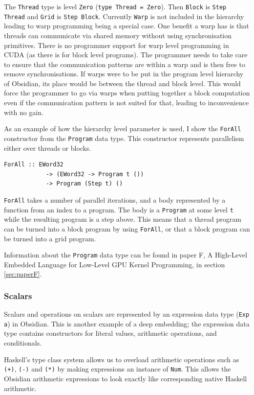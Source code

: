 \documentclass[a4paper]{book}
\newcommand{\paperFTitle}{A High-Level Embedded Language for Low-Level GPU Kernel Programming}
\begin{document}
The {\tt Thread} type is level {\tt Zero} ({\tt type Thread = Zero}). Then {\tt Block} is 
{\tt Step Thread} and {\tt Grid} is {\tt Step Block}. Currently {\tt Warp} is not included 
in the hierarchy leading to warp programming being a special case. One benefit a warp has is 
that threads can communicate via shared memory without using synchronisation primitives. There 
is no programmer support for warp level programming in CUDA (as there is for block level 
programs). The programmer needs to take care to ensure that the communication patterns are 
within a warp and is then free to remove synchronisations. If warps were to be put in the 
program level hierarchy of Obsidian, its place would be between the thread and block level. 
This would force the programmer to go via warps when putting together a block computation even 
if the communication pattern is not suited for that, leading to inconvenience with no gain. 

As an example of how the hierarchy level parameter is used, I show the {\tt ForAll} constructor 
from the {\tt Program} data type.  This constructor represents parallelism either over threads 
or blocks. 

\begin{verbatim}
ForAll :: EWord32 
            -> (EWord32 -> Program t ())
            -> Program (Step t) ()
\end{verbatim}

{\tt ForAll} takes a number of parallel iterations, and a body represented by a function 
from an index to a program. The body is a {\tt Program} at some level {\tt t} while the 
resulting program is a step above. This means that a thread program can be turned into 
a block program by using {\tt ForAll}, or that a block program can be turned into a grid program. 

Information about the {\tt Program} data type can be found in paper F, \paperFTitle, in 
section \ref{sec:paperF}. 

\subsubsection{Scalars} 

Scalars and operations on scalars are represented by an expression data type ({\tt Exp a}) in 
Obsidian. This is another example of a deep embedding; the expression data type contains 
constructors for literal values, arithmetic operations, and conditionals. 

Haskell's type class system allows us to overload arithmetic operations such as {\tt (+)}, 
{\tt (-)} and {\tt (*)} by making expressions an instance of {\tt Num}. This allows the 
Obsidian arithmetic expressions to look exactly like corresponding native Haskell arithmetic. 
\end{document}
